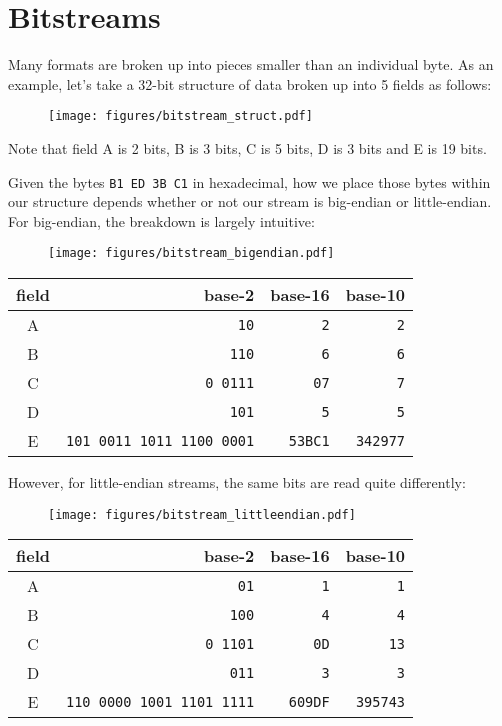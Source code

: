 \section{Bitstreams}
\label{bitstreams}
Many formats are broken up into pieces smaller than an individual byte.
As an example, let's take a 32-bit structure of data broken up into 5
fields as follows:
\begin{figure}[h]
\texttt{[image: figures/bitstream\_struct.pdf]}
\end{figure}
\par
\noindent
Note that field A is 2 bits, B is 3 bits, C is 5 bits, D is 3 bits
and E is 19 bits.
\par
Given the bytes \texttt{B1 ED 3B C1} in hexadecimal,
how we place those bytes within our structure depends
whether or not our stream is big-endian or little-endian.
For big-endian, the breakdown is largely intuitive:
\begin{figure}[h]
\texttt{[image: figures/bitstream\_bigendian.pdf]}
\end{figure}
\par
\noindent
\begin{tabular}{c r r r}
field & base-2 & base-16 & base-10 \\
\hline
A & \texttt{10} & \texttt{2} & \texttt{2} \\
B & \texttt{110} & \texttt{6} & \texttt{6} \\
C & \texttt{0 0111} & \texttt{07} & \texttt{7} \\
D & \texttt{101} & \texttt{5} & \texttt{5} \\
E & \texttt{101 0011 1011 1100 0001} & \texttt{53BC1} & \texttt{342977} \\
\end{tabular}
\par
\noindent
However, for little-endian streams, the same bits are read quite differently:
\begin{figure}[h]
\texttt{[image: figures/bitstream\_littleendian.pdf]}
\end{figure}
\par
\noindent
\begin{tabular}{c r r r}
field & base-2 & base-16 & base-10 \\
\hline
A & \texttt{01} & \texttt{1} & \texttt{1} \\
B & \texttt{100} & \texttt{4} & \texttt{4} \\
C & \texttt{0 1101} & \texttt{0D} & \texttt{13} \\
D & \texttt{011} & \texttt{3} & \texttt{3} \\
E & \texttt{110 0000 1001 1101 1111} & \texttt{609DF} & \texttt{395743} \\
\end{tabular}
